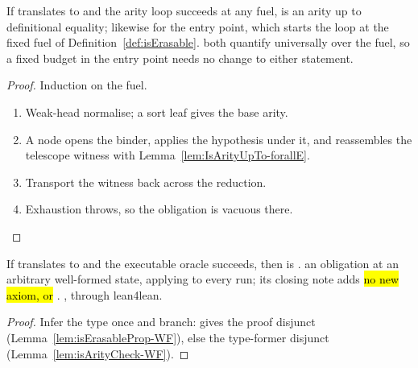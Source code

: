 \begin{lemma}
\label{lem:isArityCheck-WF}
\leanok
{} If  translates to  and the arity loop succeeds at any fuel,
 is an arity up to definitional equality; likewise for the entry point, which starts the
loop at the fixed fuel of Definition~\ref{def:isErasable}.
 both quantify universally over the fuel, so a fixed budget in the entry point needs no
change to either statement.
\end{lemma}
\begin{proof}
\leanok
{}
 Induction on the fuel.
\begin{enumerate}
\item Weak-head normalise; a sort leaf gives the base arity.
\item A  node opens the binder, applies the hypothesis under it, and reassembles the
telescope witness with Lemma~\ref{lem:IsArityUpTo-forallE}.
\item Transport the witness back across the reduction.
\item Exhaustion throws, so the obligation is vacuous there.
\end{enumerate}
\end{proof}

\begin{theorem}
\label{thm:isErasable-WF}
\leanok
{} If  translates to  and the executable oracle succeeds, then
 is \Erasable{}.
 an obligation at an arbitrary well-formed state, applying to every run; its closing
note adds \hl{no new axiom,  or }.
 \stProved{}, \stInherited{} through lean4lean.
\end{theorem}
\begin{proof}
\leanok
{}
 Infer the type once and branch:  gives the proof disjunct
(Lemma~\ref{lem:isErasableProp-WF}), else the type-former disjunct
(Lemma~\ref{lem:isArityCheck-WF}).
\end{proof}

